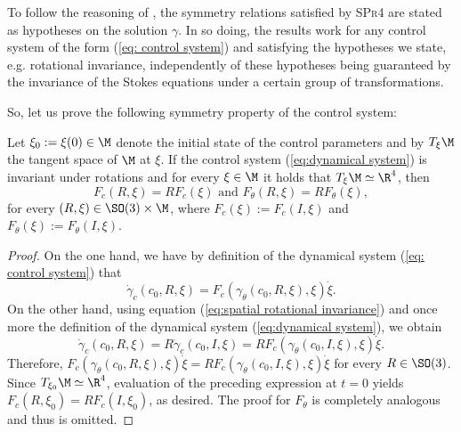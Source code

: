 \begin{remark}
To follow the reasoning of \cite{Alouges2017}, the symmetry relations satisfied by \textsc{SPr4} are stated as hypotheses on the solution $\gamma$. In so doing, the results work for any control system of the form (\ref{eq: control system}) and satisfying the hypotheses we state, e.g. rotational invariance, independently of these hypotheses being guaranteed by the invariance of the Stokes equations under a certain group of transformations. 
\end{remark}
So, let us prove the following symmetry property of the control system:
\begin{proposition}
\label{prop: rotational invariance}
Let $\xi_0 := \xi(0) \in \M$ denote the initial state of the control parameters and by $T_{\xi}\M$ the tangent space of $\M$ at $\xi$. If the control system (\ref{eq:dynamical system}) is invariant under rotations and for every $\xi \in \M$ it holds that $T_{\xi} \M \simeq \R^4$, then
\begin{equation}
	F_c(R, \xi) = R F_c(\xi) \text { and } F_\theta(R, \xi) = R F_{\theta} ( \xi),
\end{equation}
for every $(R, \xi) \in \SO(3) \times \M$, where $F_c(\xi) := F_{c}(I, \xi)$ and $F_{\theta}(\xi) := F_{\theta}(I, \xi)$. 
\end{proposition}

\begin{proof}
On the one hand, we have by definition of the dynamical system (\ref{eq: control system}) that
\begin{equation}
	\dot{\gamma}_c(c_0, R, \xi) = F_c(\gamma_{\theta}(c_0, R, \xi), \xi) \dot{\xi}.
\end{equation}
On the other hand, using equation (\ref{eq:spatial rotational invariance}) and once more the definition of the dynamical system (\ref{eq:dynamical system}), we obtain
\begin{equation}
	\dot{\gamma}_c (c_0, R, \xi) = R  \dot{\gamma}_c(c_0, I, \xi) = 
	R F_c(\gamma_{\theta}(c_0, I, \xi), \xi) \dot{\xi}.
\end{equation}
Therefore, $F_c(\gamma_{\theta}(c_0, R, \xi), \xi) \dot{\xi} = R F_{c}(\gamma_{\theta}(c_0, I, \xi), \xi) \dot{\xi}$ for every $R \in \SO(3)$. Since $T_{\xi_0} \M \simeq \R^4$, evaluation of the preceding expression at $t = 0$ yields $F_{c}(R, \xi_0) = R F_{c}(I, \xi_0)$, as desired. The proof for $F_{\theta}$ is completely analogous and thus is omitted.
\end{proof}

